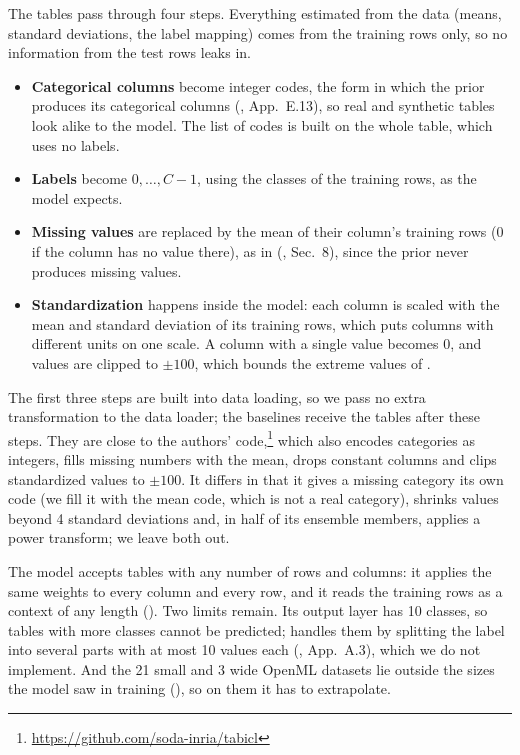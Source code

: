 The tables pass through four steps. Everything estimated from the data
(means, standard deviations, the label mapping) comes from the training rows
only, so no information from the test rows leaks in.
\begin{itemize}
  \item \textbf{Categorical columns} become integer codes, the form in which
    the prior produces its categorical columns (\citealt{qu2026tabiclv2},
    App.~E.13), so real and synthetic tables look alike to the model. The
    list of codes is built on the whole table, which uses no labels.
  \item \textbf{Labels} become $0, \dots, C-1$, using the classes of the
    training rows, as the model expects.
  \item \textbf{Missing values} are replaced by the mean of their column's
    training rows (0 if the column has no value there), as in \tabicl{}
    (\citealt{qu2026tabiclv2}, Sec.~8), since the prior never produces
    missing values.
  \item \textbf{Standardization} happens inside the model: each column is
    scaled with the mean and standard deviation of its training rows, which
    puts columns with different units on one scale. A column with a single
    value becomes 0, and values are clipped to $\pm 100$, which bounds the
    extreme values of .
\end{itemize}
The first three steps are built into data loading, so we pass no extra
transformation to the data loader; the baselines receive the
tables after these steps. They are close to the authors'
code,\footnote{\url{https://github.com/soda-inria/tabicl}} which also encodes
categories as integers, fills missing numbers with the mean, drops constant
columns and clips standardized values to $\pm 100$. It differs in that it
gives a missing category its own code (we fill it with the mean code, which
is not a real category), shrinks values beyond 4 standard deviations and, in
half of its ensemble members, applies a power transform; we leave both out.

The model accepts tables with any number of rows and columns: it
applies the same weights to every column and every row, and it reads the
training rows as a context of any length (). Two limits
remain. Its output layer has 10 classes, so tables with more classes cannot
be predicted; \tabicl{} handles them by splitting the label into several
parts with at most 10 values each (\citealt{qu2026tabiclv2}, App.~A.3),
which we do not implement. And the 21 small and 3 wide OpenML datasets lie
outside the sizes the model saw in training (), so on
them it has to extrapolate.

